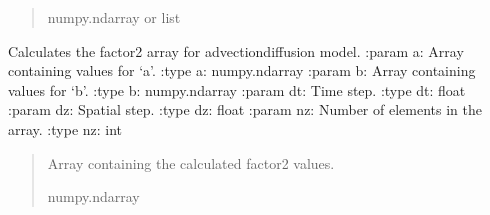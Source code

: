 \documentclass[a4paper,11pt,english,openany]{sphinxmanual}
\begin{document}
\begin{fulllineitems}
\begin{fulllineitems}
\begin{quote}
\begin{description}
\begin{description}
\end{description}


\sphinxAtStartPar
numpy.ndarray or list

\end{description}\end{quote}

\end{fulllineitems}


\begin{fulllineitems}
\label{\detokenize{api/spyice.models.advection_diffusion:spyice.models.advection_diffusion.AdvectionDiffusion.factor_2}}
\pysigstartsignatures
{}
\pysigstopsignatures
\sphinxAtStartPar
Calculates the factor2 array for advection\sphinxhyphen{}diffusion model.
:param a: Array containing values for ‘a’.
:type a: numpy.ndarray
:param b: Array containing values for ‘b’.
:type b: numpy.ndarray
:param dt: Time step.
:type dt: float
:param dz: Spatial step.
:type dz: float
:param nz: Number of elements in the array.
:type nz: int
\begin{quote}\begin{description}
\sphinxAtStartPar
Array containing the calculated factor2 values.

\sphinxAtStartPar
numpy.ndarray

\end{description}\end{quote}

\end{fulllineitems}



\end{fulllineitems}
\end{document}
